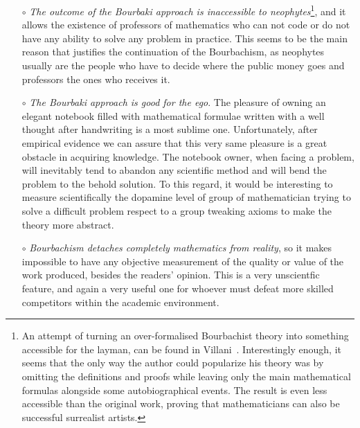 \documentclass[]{scrartcl}
\theoremstyle{definition}
\begin{document}
\begin{itemize}
    \item[$\circ$] \emph{The outcome of the Bourbaki approach is inaccessible to neophytes}\footnote{
        An attempt of turning an over-formalised Bourbachist theory into something accessible for the layman, can be found in Villani~\cite{villani2003livingtheorem}. Interestingly enough, it seems that the only way the author could popularize his theory was by omitting the definitions and proofs while leaving only the main mathematical formulas alongside some autobiographical events. The result is even less accessible than the original work, proving that mathematicians can also be successful surrealist artists.
    }, and it allows the existence of professors of mathematics who can not code or do not have any ability to solve any problem in practice. This seems to be the main reason that justifies the continuation of the Bourbachism, as neophytes usually are the people who have to decide where the public money goes and professors the ones who receives it.

    \item[$\circ$] \emph{The Bourbaki approach is good for the ego}. The pleasure of owning an elegant notebook filled with mathematical formulae written with a well thought after handwriting is a most sublime one. Unfortunately, after empirical evidence we can assure that this very same pleasure is a great obstacle in acquiring knowledge. The notebook owner, when facing a problem, will inevitably tend to abandon any scientific method and will bend the problem to the behold solution. To this regard, it would be interesting to measure scientifically the dopamine level of group of mathematician trying to solve a difficult problem respect to a group tweaking axioms to make the theory more abstract.

    \item[$\circ$] \emph{Bourbachism detaches completely mathematics from reality}, so it makes impossible to have any objective measurement of the quality or value of the work produced, besides the readers' opinion. This is a very unscientfic feature, and again a very useful one for whoever must defeat  more skilled competitors within the academic environment.


\end{itemize}
\end{document}
